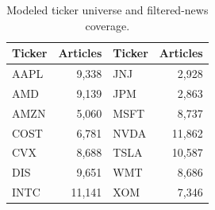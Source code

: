 \begin{table}[t]
  \caption{Modeled ticker universe and filtered-news coverage.}
  \label{tab:ticker-universe}
  \centering
  \small
  \setlength{\tabcolsep}{4pt}
  \begin{tabular}{lrlr}
    \toprule
    Ticker & Articles & Ticker & Articles \\
    \midrule
    AAPL & 9,338 & JNJ & 2,928 \\
    AMD & 9,139 & JPM & 2,863 \\
    AMZN & 5,060 & MSFT & 8,737 \\
    COST & 6,781 & NVDA & 11,862 \\
    CVX & 8,688 & TSLA & 10,587 \\
    DIS & 9,651 & WMT & 8,686 \\
    INTC & 11,141 & XOM & 7,346 \\
    \bottomrule
  \end{tabular}
\end{table}
